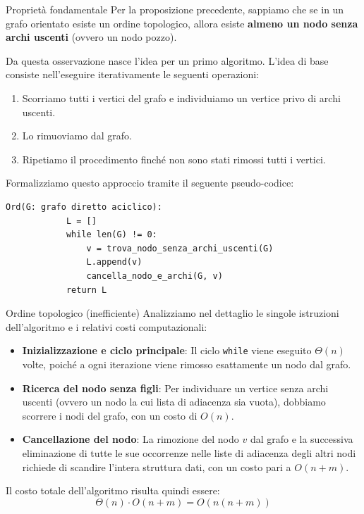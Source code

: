 \documentclass[12pt]{report}
\begin{document}
	\begin{osservazione}{Proprietà fondamentale}{}
		Per la proposizione precedente, sappiamo che se in un grafo orientato esiste un ordine topologico, allora esiste \textbf{almeno un nodo senza archi uscenti} (ovvero un nodo pozzo).
	\end{osservazione}
	
	Da questa osservazione nasce l'idea per un primo algoritmo. L'idea di base consiste nell'eseguire iterativamente le seguenti operazioni:
	\begin{enumerate}
		\item Scorriamo tutti i vertici del grafo e individuiamo un vertice privo di archi uscenti.
		
		\item Lo rimuoviamo dal grafo.
		
		\item Ripetiamo il procedimento finché non sono stati rimossi tutti i vertici.
	\end{enumerate}
	
	Formalizziamo questo approccio tramite il seguente pseudo-codice:
	
	\begin{lstlisting}[style=stile-listings, caption={Algoritmo ingenuo per l'ordine topologico}]
		Ord(G: grafo diretto aciclico):
			L = []
			while len(G) != 0:
				v = trova_nodo_senza_archi_uscenti(G)
				L.append(v)
				cancella_nodo_e_archi(G, v)
			return L
	\end{lstlisting}
	
	\begin{algoritmo}{Ordine topologico (inefficiente)}{}
		Analizziamo nel dettaglio le singole istruzioni dell'algoritmo e i relativi costi computazionali:
		\begin{itemize}
			\item \textbf{Inizializzazione e ciclo principale}: Il ciclo \texttt{while} viene eseguito $\Theta(n)$ volte, poiché a ogni iterazione viene rimosso esattamente un nodo dal grafo.
			
			\item \textbf{Ricerca del nodo senza figli}: Per individuare un vertice senza archi uscenti (ovvero un nodo la cui lista di adiacenza sia vuota), dobbiamo scorrere i nodi del grafo, con un costo di $O(n)$.
			
			\item \textbf{Cancellazione del nodo}: La rimozione del nodo $v$ dal grafo e la successiva eliminazione di tutte le sue occorrenze nelle liste di adiacenza degli altri nodi richiede di scandire l'intera struttura dati, con un costo pari a $O(n + m)$.
		\end{itemize}
		
		Il costo totale dell'algoritmo risulta quindi essere:
		\[
		\Theta(n) \cdot O(n + m) = O(n(n + m))
		\]
	\end{algoritmo}
	
\end{document}
